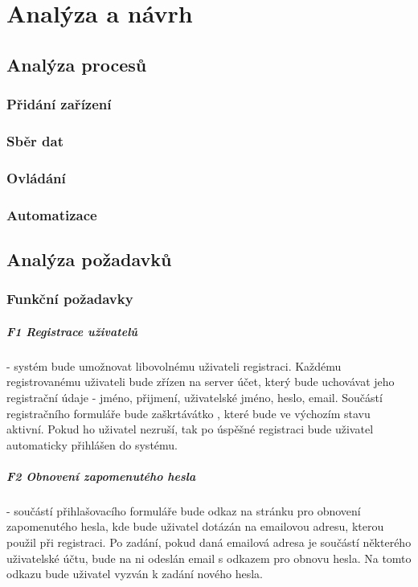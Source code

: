 \documentclass[thesis=B,czech]{FITthesis}[2019/12/23]
\begin{document}
\chapter{Analýza a návrh}

\section{Analýza procesů}

\subsection{Přidání zařízení}

\subsection{Sběr dat}

\subsection{Ovládání}

\subsection{Automatizace}



\section{Analýza požadavků}

\subsection{Funkční požadavky}

\paragraph{F1 Registrace uživatelů}
- systém bude umožnovat libovolnému uživateli registraci. Každému registrovanému uživateli bude zřízen na server účet, který bude uchovávat jeho registrační údaje - jméno, přijmení, uživatelské jméno, heslo, email. Součástí registračního formuláře bude zaškrtávátko , které bude ve výchozím stavu aktivní. Pokud ho uživatel nezruší, tak po úspěšné registraci bude uživatel automaticky přihlášen do systému.

\paragraph{F2 Obnovení zapomenutého hesla}
- součástí přihlašovacího formuláře bude odkaz na stránku pro obnovení zapomenutého hesla, kde bude uživatel dotázán na emailovou adresu, kterou použil při registraci. Po zadání, pokud daná emailová adresa je součástí některého uživatelské účtu, bude na ni odeslán email s odkazem pro obnovu hesla. Na tomto odkazu bude uživatel vyzván k zadání nového hesla.
\end{document}

